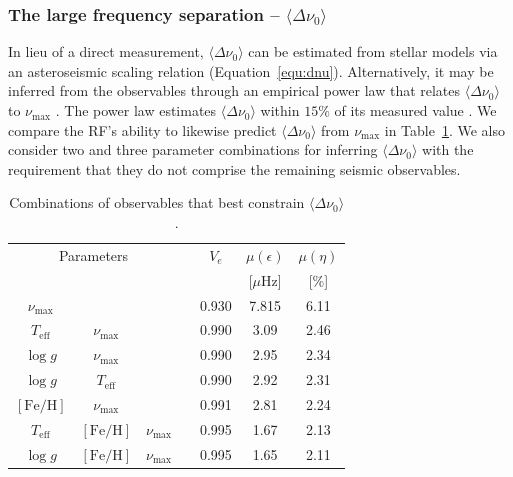 \subsubsection*{The large frequency separation -- $\langle\Delta\nu_0\rangle$}



In lieu of a direct measurement, ${\langle\Delta\nu_0\rangle}$ can be estimated from stellar models via an asteroseismic scaling relation (Equation~\ref{equ:dnu}). Alternatively, it may be inferred from the observables through an empirical power law that relates ${\langle\Delta\nu_0\rangle}$ to $\nu_{\max}$ \citep{2009A&A...506..465H,2009MNRAS.400L..80S}. 
The power law estimates ${\langle\Delta\nu_0\rangle}$ within  $15\%$ of its measured value \citep{2009MNRAS.400L..80S}.
We compare the RF's ability to likewise predict ${\langle\Delta\nu_0\rangle}$ from $\nu_{\max}$ in Table~\ref{tab:dnu}. We also consider two and three parameter combinations for inferring ${\langle\Delta\nu_0\rangle}$ with the requirement that they do not comprise the remaining seismic observables. 

\begin{table}
\centering
\caption{Combinations of observables that best constrain $\langle\Delta\nu_0\rangle$.}
    \label{tab:dnu}
    \begin{tabular}{ccccccc}
    \hline \hline
\multicolumn{3}{c}{Parameters} && $V_e$ & $\mu (\epsilon)$ & $\mu (\eta)$  \\  
&&&&&[$\mu$Hz] & [\%] \\ \hline
$\nu_{\max}$ &  &   &&0.930 & 7.815 & 6.11 \\ 
$T_{\text{eff}}$     & $\nu_{\max}$&     &&0.990  & 3.09 & 2.46 \\
$\log{} g$     &$\nu_{\max}$ &               &&0.990  & 2.95 & 2.34 \\
$\log{} g$     &  $T_{\text{eff}}$&                 & &0.990  & 2.92 & 2.31\\
$[\text{Fe/H}]$  & $\nu_{\max}$ &                 &&0.991  & 2.81 & 2.24\\
$T_{\text{eff}}$ & $[\text{Fe/H}]$ & $\nu_{\max}$ && 0.995 & 1.67 & 2.13 \\
$\log{} g$ & $[\text{Fe/H}]$ & $\nu_{\max}$ && 0.995 & 1.65 & 2.11\\
\hline
    \end{tabular}
\end{table}

